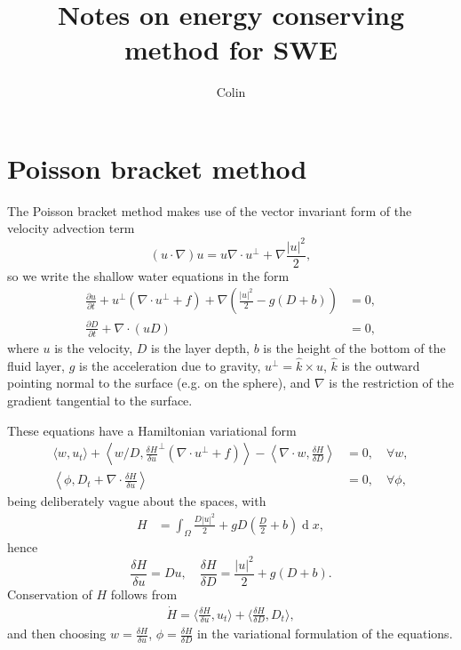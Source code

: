 \documentclass{article}
\newcommand{\pp}[2]{\frac{\partial #1}{\partial #2}}
\newcommand{\dede}[2]{\frac{\delta #1}{\delta #2}}
\DeclareMathOperator{\diff}{d}
\begin{document}
\title{Notes on energy conserving method for SWE}
\author{Colin}
\maketitle

\section{Poisson bracket method}

The Poisson bracket method makes use of the vector invariant form of
the velocity advection term
\[
(u\cdot \nabla)u = u\nabla\cdot u^{\perp} + \nabla\frac{|u|^2}{2},
\]
so we write the shallow water equations in the form
\begin{align}
  \pp{u}{t} + u^\perp(\nabla\cdot u^{\perp} + f) + \nabla\left(\frac{|u|^2}{2}
  - g(D+b)\right) & = 0, \\
  \pp{D}{t} + \nabla\cdot(uD) & = 0,
\end{align}
where $u$ is the velocity, $D$ is the layer depth, $b$ is the height
of the bottom of the fluid layer, $g$ is the acceleration due to
gravity, $u^{\perp} = \hat{k}\times u$, $\hat{k}$ is the outward
pointing normal to the surface (e.g. on the sphere), and $\nabla$ is
the restriction of the gradient tangential to the surface.

These equations have a Hamiltonian variational form
\begin{align}
  \langle w, u_t \rangle +
  \left\langle w/D, {\dede{H}{u}}^\perp (\nabla\cdot u^\perp + f)
  \right\rangle - \left\langle
  \nabla\cdot w, \dede{H}{D}
  \right\rangle & = 0, \quad \forall w,
  \\
  \left\langle \phi, D_t + \nabla\cdot \dede{H}{u} \right\rangle & = 0,
  \quad \forall \phi,
\end{align}
being deliberately vague about the spaces, with
\begin{align}
  H &= \int_\Omega \frac{D|u|^2}{2} + gD\left(\frac{D}{2} + b\right) \diff x,
\end{align}
hence
\begin{equation}
  \dede{H}{u} = Du, \quad \dede{H}{D} = \frac{|u|^2}{2} + g(D+b).
\end{equation}
Conservation of $H$ follows from
\begin{align}
  \label{eq:econ}
  \dot{H} = \langle \dede{H}{u}, u_t \rangle + \langle \dede{H}{D}, D_t \rangle,
\end{align}
and then choosing $w=\dede{H}{u}$, $\phi=\dede{H}{D}$ in the variational
formulation of the equations.
\end{document}
